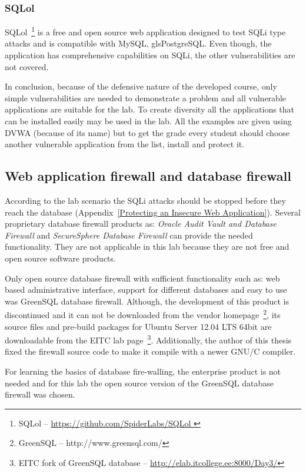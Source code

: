 \subsubsection{SQLol}
SQLol~\footnote{SQLol -- \url{https://github.com/SpiderLabs/SQLol
}} is a free and open source web application designed to test \gls{SQLi} type attacks and is compatible with \gls{MySQL}, gls{PostgreSQL}. Even though, the application has comprehensive capabilities on \gls{SQLi}, the other vulnerabilities are not covered.


In conclusion, because of the defensive nature of the developed course, only simple vulnerabilities are needed to demonstrate a problem and all vulnerable applications are suitable for the lab. To create diversity all the applications that can be installed easily may be used in the lab. All the examples are given using \gls{DVWA} (because of its name) but to get the grade every student should choose another vulnerable application from the list, install  and protect it.

\subsection{Web application firewall and database firewall}


According to the lab scenario the \gls{SQLi} attacks should be stopped before they reach the database (Appendix~\ref{Protecting an Insecure Web Application}). Several proprietary database firewall products as: \emph{Oracle Audit Vault and Database Firewall} and \emph{SecureSphere Database Firewall} can provide the needed functionality. They are not applicable in this lab because they are not free and open source software products.

Only open source database firewall with sufficient functionality such as: web based administrative interface, support for different databases and easy to use was GreenSQL database firewall. Although, the development of this product is discontinued  and it can not be downloaded from the vendor homepage~\footnote{GreenSQL -- http://www.greensql.com/}, its source files and pre-build packages for Ubuntu Server 12.04 LTS 64bit are downloadable from the \gls{EITC} lab page~\footnote{\gls{EITC} fork of GreenSQL database -- \url{http://elab.itcollege.ee:8000/Day3/}}. Additionally, the author of this thesis fixed the firewall source code to make it compile with a newer GNU/C compiler.

For learning the basics of database fire-walling, the enterprise product is not needed and for this lab the open source version of the GreenSQL database firewall was chosen.

